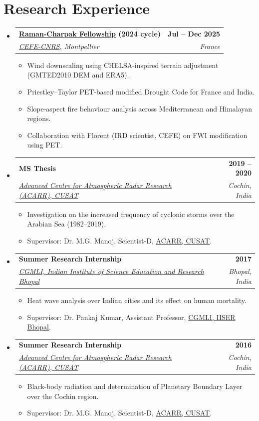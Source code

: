 \documentclass[letterpaper,11pt]{article}
\makeatletter
\newcommand{\resumeItem}[1]{
  \item\small{
    {\justifying #1 \vspace{-2pt}}
  }
}
\newcommand{\resumeSubheading}[4]{
  \vspace{-2pt}\item
    \begin{tabular*}{1.0\textwidth}[t]{l@{\extracolsep{\fill}}r}
      \textbf{#1} & \textbf{\small #2} \\
      \textit{\small#3} & \textit{\small #4} \\
    \end{tabular*}\vspace{-7pt}
}
\newcommand{\resumeSubHeadingListStart}{\begin{itemize}[leftmargin=0.0in, label={}]}
\newcommand{\resumeSubHeadingListEnd}{\end{itemize}}
\newcommand{\resumeItemListStart}{\begin{itemize}[itemsep=1pt,parsep=0pt,topsep=2pt]}
\newcommand{\resumeItemListEnd}{\end{itemize}\vspace{-5pt}}
\makeatother
\begin{document}
\section{Research Experience}
  \resumeSubHeadingListStart
    \resumeSubheading
      {\href{https://www.inde.campusfrance.org/raman-charpak-fellowship}{Raman-Charpak Fellowship} (2024 cycle)}{Jul -- Dec 2025}
      {\href{https://www.cefe.cnrs.fr/en/research-dpt/functional-ecology/forecast-en}{CEFE-CNRS}, Montpellier}{France}
      \resumeItemListStart
        \resumeItem{Wind downscaling using CHELSA-inspired terrain adjustment (GMTED2010 DEM and ERA5).}
        \resumeItem{Priestley--Taylor PET-based modified Drought Code for France and India.}
        \resumeItem{Slope-aspect fire behaviour analysis across Mediterranean and Himalayan regions.}
        \resumeItem{Collaboration with Florent (IRD scientist, CEFE) on FWI modification using PET.}
      \resumeItemListEnd

    \resumeSubheading
      {MS Thesis}{2019 -- 2020}
      {\href{https://acarr.cusat.ac.in/}{Advanced Centre for Atmospheric Radar Research (ACARR), CUSAT}}{Cochin, India}
      \resumeItemListStart
        \resumeItem{Investigation on the increased frequency of cyclonic storms over the Arabian Sea (1982--2019).}
        \resumeItem{Supervisor: Dr. M.G. Manoj, Scientist-D, \href{https://acarr.cusat.ac.in/}{ACARR, CUSAT}.}
      \resumeItemListEnd

    \resumeSubheading
      {Summer Research Internship}{2017}
      {\href{https://home.iiserb.ac.in/~kumarp/}{CGMLI, Indian Institute of Science Education and Research Bhopal}}{Bhopal, India}
      \resumeItemListStart
        \resumeItem{Heat wave analysis over Indian cities and its effect on human mortality.}
        \resumeItem{Supervisor: Dr. Pankaj Kumar, Assistant Professor, \href{https://home.iiserb.ac.in/~kumarp/}{CGMLI, IISER Bhopal}.}
      \resumeItemListEnd

    \resumeSubheading
      {Summer Research Internship}{2016}
      {\href{https://acarr.cusat.ac.in/}{Advanced Centre for Atmospheric Radar Research (ACARR), CUSAT}}{Cochin, India}
      \resumeItemListStart
        \resumeItem{Black-body radiation and determination of Planetary Boundary Layer over the Cochin region.}
        \resumeItem{Supervisor: Dr. M.G. Manoj, Scientist-D, \href{https://acarr.cusat.ac.in/}{ACARR, CUSAT}.}
      \resumeItemListEnd
  \resumeSubHeadingListEnd
\vspace{-0.15cm}
\end{document}
